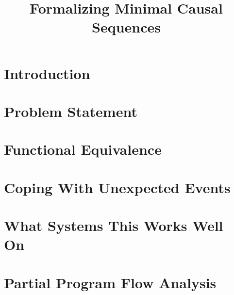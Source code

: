 \documentclass{article}
\begin{document}
\title{Formalizing Minimal Causal Sequences}
   \date{}
   \maketitle
   \thispagestyle{empty}

\section{Introduction}
\label{sec:intro}


\section{Problem Statement}
\label{sec:problem_statement}


\section{Functional Equivalence}
\label{sec:functional_equivs}


\section{Coping With Unexpected Events}
\label{sec:unexpected}


\section{What Systems This Works Well On}
\label{sec:systems}


\section{Partial Program Flow Analysis}
\label{sec:program_flow}


\renewcommand{\baselinestretch}{0.97}


%
\end{document}
